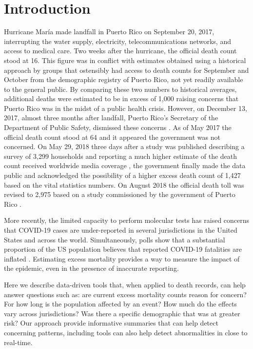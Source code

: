 \documentclass[11pt]{article}
\begin{document}
\newpage

\section{Introduction}
\label{sec:introduction}
Hurricane Mar\'ia made landfall in Puerto Rico on September 20, 2017, interrupting the water supply, electricity, telecommunications networks, and access to medical care\cite{updates2018puerto, rogers2017puerto}. Two weeks after the hurricane, the official death count stood at 16\cite{hoyos2018puerto}. This figure was in conflict with estimates obtained using a historical approach by groups that ostensibly had access to death counts for September and October from the demographic registry of Puerto Rico, not yet readily available to the general public. By comparing these two numbers to historical averages, additional deaths were estimated to be in excess of 1,000 \cite{santos2018use, robles2017official, rivera2018estimating, pascual2017nearly} raising concerns that Puerto Rico was in the midst of a public health crisis. However, on December 13, 2017, almost three months after landfall, Puerto Rico’s Secretary of the Department of Public Safety, dismissed these concerns \cite{robles2017official}. As of May 2017 the official death count stood at 64 \cite{hoyos2018puerto} and it appeared the government was not concerned. On May 29, 2018 three days after a study was published describing a survey of 3,299 households and reporting a much higher estimate of the death count received worldwide media coverage \cite{kishore2018mortality}, the government finally made the data public and acknowledged the possibility of a higher excess death count of 1,427 \cite{report2019} based on the vital statistics numbers. On August 2018 the official death toll was revised to 2,975 based on a study commissioned by the government of Puerto Rico \cite{santos2018differential}.

More recently, the limited capacity to perform molecular tests has raised concerns that COVID-19 cases are under-reported in several jurisdictions in the United States and across the world. Simultaneously, polls show that a substantial proportion of the US population believes that reported COVID-19 fatalities are inflated \cite{talev2020}. Estimating excess mortality provides a way to measure the impact of the epidemic, even in the presence of inaccurate reporting.

Here we describe data-driven tools that, when applied to death records, can help answer questions such as: are current excess mortality counts reason for concern? For how long is the population affected by an event?  How much do the effects vary across jurisdictions?  Was there a specific demographic that was at greater risk? Our approach provide informative summaries that can help detect concerning patterns, including tools can also help detect abnormalities in close to real-time. 
\end{document}
